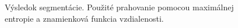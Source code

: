 \documentclass[a4paper,11pt,oneside]{article}%
\begin{document}
\begin{figure}[H]
    \hspace{5px}
    \hspace{5px}
    \caption{Výsledok segmentácie. Použité prahovanie pomocou maximálnej entropie a znamienková funkcia vzdialenosti.}
    \label{fig:kapur_sdf}
\end{figure}
\end{document}
